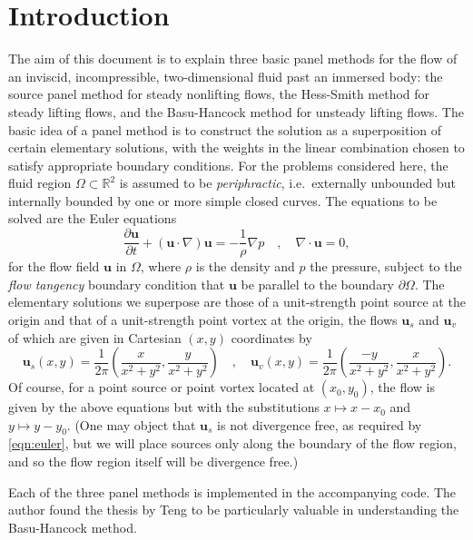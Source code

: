 \documentclass[10pt]{article}
\newcommand\defn[1]{\emph{#1}}
\newcommand\pd[2]{\frac{\partial{#1}}{\partial{#2}}}
\def\ie{i.e.~}
\begin{document}
\section{Introduction}
The aim of this document is to explain three basic panel methods for the flow of an inviscid, incompressible, two-dimensional fluid past an immersed body: the source panel method for steady nonlifting flows, the Hess-Smith method \cite{hess-smith} for steady lifting flows, and the Basu-Hancock method \cite{basu-hancock} for unsteady lifting flows.  The basic idea of a panel method is to construct the solution as a superposition of certain elementary solutions, with the weights in the linear combination chosen to satisfy appropriate boundary conditions.  For the problems considered here, the fluid region $\Omega\subset\mathbb R^2$ is assumed to be \defn{periphractic}, \ie externally unbounded but internally bounded by one or more simple closed curves.  The equations to be solved are the Euler equations
\begin{equation}\label{eqn:euler}
\pd{\mathbf u}{t}+(\mathbf u\cdot\nabla)\mathbf u = -\frac{1}{\rho}\nabla p\quad,\quad\nabla\cdot{\mathbf u}=0,
\end{equation}
for the flow field $\mathbf u$ in $\Omega$, where $\rho$ is the density and $p$ the pressure, subject to the \defn{flow tangency} boundary condition that $\mathbf u$ be parallel to the boundary $\partial\Omega$.  The elementary solutions we superpose are those of a unit-strength point source at the origin and that of a unit-strength point vortex at the origin, the flows $\mathbf u_s$ and $\mathbf u_v$ of which are given in Cartesian $(x,y)$ coordinates by \[\mathbf u_s(x,y) = \frac{1}{2\pi}\left(\frac{x}{x^2+y^2},\frac{y}{x^2+y^2}\right)\quad,\quad\mathbf u_v(x,y) = \frac{1}{2\pi}\left(\frac{-y}{x^2+y^2},\frac{x}{x^2+y^2}\right).\]  Of course, for a point source or point vortex located at $(x_0,y_0)$, the flow is given by the above equations but with the substitutions $x\mapsto x-x_0$ and $y\mapsto y-y_0$.  (One may object that $\mathbf u_s$ is not divergence free, as required by \eqref{eqn:euler}, but we will place sources only along the boundary of the flow region, and so the flow region itself will be divergence free.)

Each of the three panel methods is implemented in the accompanying code.  The author found the thesis by Teng \cite{teng-thesis} to be particularly valuable in understanding the Basu-Hancock method.
\end{document}
